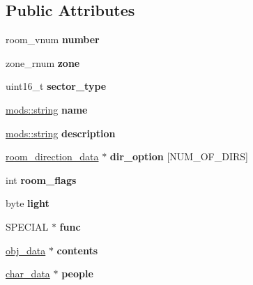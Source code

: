 \subsection*{Public Attributes}
\begin{DoxyCompactItemize}
\item 
\mbox{\label{structroom__data_ac02ddee80e6baae69013cfca076ad215}} 
room\+\_\+vnum {\bfseries number}
\item 
\mbox{\label{structroom__data_a0abda0c8a49d2b24dc06c11b9bef1dc4}} 
zone\+\_\+rnum {\bfseries zone}
\item 
\mbox{\label{structroom__data_a92befc8bc457e557927f8331a8ab3371}} 
uint16\+\_\+t {\bfseries sector\+\_\+type}
\item 
\mbox{\label{structroom__data_ade1a73004006f5a1ced7350c675eaa76}} 
\hyperlink{structmods_1_1string}{mods\+::string} {\bfseries name}
\item 
\mbox{\label{structroom__data_ad321243cda8b9a81ea8ee035a51d04f7}} 
\hyperlink{structmods_1_1string}{mods\+::string} {\bfseries description}
\item 
\mbox{\label{structroom__data_ad9454eca58e458b9b5eb29612577c3d6}} 
\hyperlink{structroom__direction__data}{room\+\_\+direction\+\_\+data} $\ast$ {\bfseries dir\+\_\+option} \mbox{[}N\+U\+M\+\_\+\+O\+F\+\_\+\+D\+I\+RS\mbox{]}
\item 
\mbox{\label{structroom__data_a84dbca4dc31fa5c684a622ae44729024}} 
int {\bfseries room\+\_\+flags}
\item 
\mbox{\label{structroom__data_a2b534af5a3f750c7205767661b568351}} 
byte {\bfseries light}
\item 
\mbox{\label{structroom__data_aae776b30a1dba3abc2824d845c3db650}} 
S\+P\+E\+C\+I\+AL $\ast$ {\bfseries func}
\item 
\mbox{\label{structroom__data_a02fe12382dbdd33e0c25a2db7ae11bc8}} 
\hyperlink{structobj__data}{obj\+\_\+data} $\ast$ {\bfseries contents}
\item 
\mbox{\label{structroom__data_a64f561d7e3b94fa7bd8ec3bc3d0e1d8f}} 
\hyperlink{structchar__data}{char\+\_\+data} $\ast$ {\bfseries people}
\end{DoxyCompactItemize}
